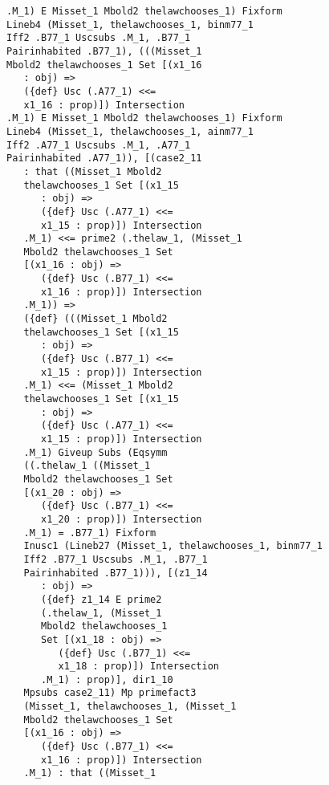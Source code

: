 \documentclass[12pt]{article}
\begin{document}
\begin{verbatim}
             .M_1) E Misset_1 Mbold2 thelawchooses_1) Fixform 
             Lineb4 (Misset_1, thelawchooses_1, binm77_1 
             Iff2 .B77_1 Uscsubs .M_1, .B77_1 
             Pairinhabited .B77_1), (((Misset_1 
             Mbold2 thelawchooses_1 Set [(x1_16 
                : obj) => 
                ({def} Usc (.A77_1) <<= 
                x1_16 : prop)]) Intersection 
             .M_1) E Misset_1 Mbold2 thelawchooses_1) Fixform 
             Lineb4 (Misset_1, thelawchooses_1, ainm77_1 
             Iff2 .A77_1 Uscsubs .M_1, .A77_1 
             Pairinhabited .A77_1)), [(case2_11 
                : that ((Misset_1 Mbold2 
                thelawchooses_1 Set [(x1_15 
                   : obj) => 
                   ({def} Usc (.A77_1) <<= 
                   x1_15 : prop)]) Intersection 
                .M_1) <<= prime2 (.thelaw_1, (Misset_1 
                Mbold2 thelawchooses_1 Set 
                [(x1_16 : obj) => 
                   ({def} Usc (.B77_1) <<= 
                   x1_16 : prop)]) Intersection 
                .M_1)) => 
                ({def} (((Misset_1 Mbold2 
                thelawchooses_1 Set [(x1_15 
                   : obj) => 
                   ({def} Usc (.B77_1) <<= 
                   x1_15 : prop)]) Intersection 
                .M_1) <<= (Misset_1 Mbold2 
                thelawchooses_1 Set [(x1_15 
                   : obj) => 
                   ({def} Usc (.A77_1) <<= 
                   x1_15 : prop)]) Intersection 
                .M_1) Giveup Subs (Eqsymm 
                ((.thelaw_1 ((Misset_1 
                Mbold2 thelawchooses_1 Set 
                [(x1_20 : obj) => 
                   ({def} Usc (.B77_1) <<= 
                   x1_20 : prop)]) Intersection 
                .M_1) = .B77_1) Fixform 
                Inusc1 (Lineb27 (Misset_1, thelawchooses_1, binm77_1 
                Iff2 .B77_1 Uscsubs .M_1, .B77_1 
                Pairinhabited .B77_1))), [(z1_14 
                   : obj) => 
                   ({def} z1_14 E prime2 
                   (.thelaw_1, (Misset_1 
                   Mbold2 thelawchooses_1 
                   Set [(x1_18 : obj) => 
                      ({def} Usc (.B77_1) <<= 
                      x1_18 : prop)]) Intersection 
                   .M_1) : prop)], dir1_10 
                Mpsubs case2_11) Mp primefact3 
                (Misset_1, thelawchooses_1, (Misset_1 
                Mbold2 thelawchooses_1 Set 
                [(x1_16 : obj) => 
                   ({def} Usc (.B77_1) <<= 
                   x1_16 : prop)]) Intersection 
                .M_1) : that ((Misset_1 

\end{verbatim}
\end{document}
